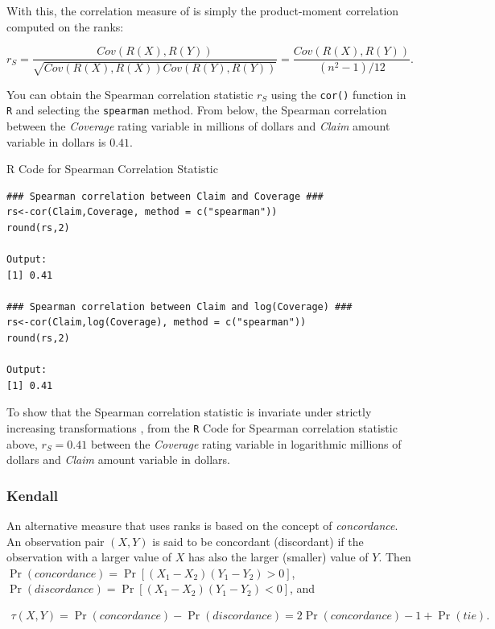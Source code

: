 \documentclass[]{book}
\theoremstyle{definition}
\theoremstyle{definition}
\theoremstyle{definition}
\theoremstyle{remark}
\begin{document}
With this, the correlation measure of \citep{spearman1904proof} is
simply the product-moment correlation computed on the ranks:

\begin{equation*}
r_S = \frac{Cov(R(X),R(Y))}{\sqrt{Cov(R(X),R(X))Cov(R(Y),R(Y))}}
= \frac{Cov(R(X),R(Y))}{(n^2-1)/12} .
\end{equation*}

You can obtain the Spearman correlation statistic \(r_S\) using the
\texttt{cor()} function in \texttt{R} and selecting the
\texttt{spearman} method. From below, the Spearman correlation between
the \emph{Coverage} rating variable in millions of dollars and
\emph{Claim} amount variable in dollars is \(0.41\).

R Code for Spearman Correlation Statistic

\hypertarget{display.spearman.2}{}
\begin{verbatim}
### Spearman correlation between Claim and Coverage ###
rs<-cor(Claim,Coverage, method = c("spearman"))
round(rs,2)

Output:
[1] 0.41

### Spearman correlation between Claim and log(Coverage) ###
rs<-cor(Claim,log(Coverage), method = c("spearman"))
round(rs,2)

Output:
[1] 0.41
\end{verbatim}

To show that the Spearman correlation statistic is invariate under
strictly increasing transformations , from the \texttt{R} Code for
Spearman correlation statistic above, \(r_S=0.41\) between the
\emph{Coverage} rating variable in logarithmic millions of dollars and
\emph{Claim} amount variable in dollars.

\subsubsection{Kendall}\label{kendall}

An alternative measure that uses ranks is based on the concept of
\emph{concordance}. An observation pair \((X,Y)\) is said to be
concordant (discordant) if the observation with a larger value of \(X\)
has also the larger (smaller) value of \(Y\). Then
\(\Pr(concordance) = \Pr[ (X_1-X_2)(Y_1-Y_2) >0 ]\),
\(\Pr(discordance) = \Pr[ (X_1-X_2)(Y_1-Y_2) <0 ]\), and

\begin{eqnarray*}
\tau(X,Y)= \Pr(concordance) - \Pr(discordance) = 2\Pr(concordance) - 1 + \Pr(tie).
\end{eqnarray*}
\end{document}
